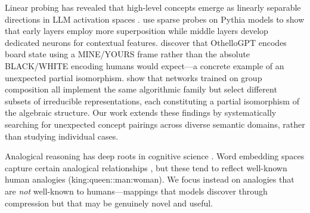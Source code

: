 Linear probing has revealed that high-level concepts emerge as linearly separable directions in LLM activation spaces \citep{zou2023representation}.
\citet{gurnee2023finding} use sparse probes on Pythia models to show that early layers employ more superposition while middle layers develop dedicated neurons for contextual features.
\citet{nanda2023emergent} discover that OthelloGPT encodes board state using a MINE/YOURS frame rather than the absolute BLACK/WHITE encoding humans would expect---a concrete example of an unexpected partial isomorphism.
\citet{chughtai2023universality} show that networks trained on group composition all implement the same algorithmic family but select different subsets of irreducible representations, each constituting a partial isomorphism of the algebraic structure.
Our work extends these findings by systematically searching for unexpected concept pairings across diverse semantic domains, rather than studying individual cases.

Analogical reasoning has deep roots in cognitive science \citep{gentner1983structure, hofstadter2001analogy}.
Word embedding spaces capture certain analogical relationships \citep{mikolov2013word2vec}, but these tend to reflect well-known human analogies (king:queen::man:woman).
We focus instead on analogies that are \emph{not} well-known to humans---mappings that models discover through compression but that may be genuinely novel and useful.
